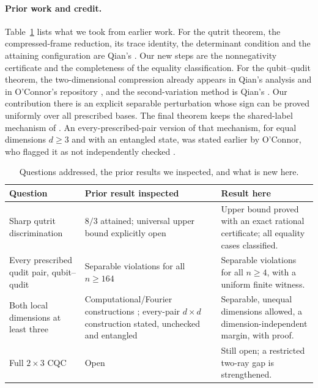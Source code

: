 \documentclass[11pt,a4paper]{article}
\numberwithin{equation}{section}
\theoremstyle{remark}\newtheorem{remark}[theorem]{Remark}
\begin{document}
\paragraph{Prior work and credit.}
Table~\ref{tab:prior} lists what we took from earlier work. For the qutrit theorem, the compressed-frame reduction, its trace identity, the determinant condition and the attaining configuration are Qian's \cite[Section~6]{qian}. Our new steps are the nonnegativity certificate and the completeness of the equality classification. For the qubit--qudit theorem, the two-dimensional compression already appears in Qian's analysis \cite[Proposition~6.9]{qian} and in O'Connor's repository \cite{oconnor}, and the second-variation method is Qian's \cite[Section~7]{qian}. Our contribution there is an explicit separable perturbation whose sign can be proved uniformly over all prescribed bases. The final theorem keeps the shared-label mechanism of \cite{wangcounter,qian}. An every-prescribed-pair version of that mechanism, for equal dimensions $d\ge3$ and with an entangled state, was stated earlier by O'Connor, who flagged it as not independently checked \cite{oconnor}.

\begin{table}[ht]
\centering\small
\caption{Questions addressed, the prior results we inspected, and what is new here.}
\label{tab:prior}
\begin{tabular}{>{\raggedright\arraybackslash}p{}>{\raggedright\arraybackslash}p{}>{\raggedright\arraybackslash}p{}}
\toprule
Question & Prior result inspected & Result here\\
\midrule
Sharp qutrit discrimination & $8/3$ attained; universal upper bound explicitly open \cite[Sections~6.5, 11(4)]{qian} & Upper bound proved with an exact rational certificate; all equality cases classified.\\
Every prescribed qudit pair, qubit--qudit & Separable violations for all $n\ge164$ \cite[Theorem~4.1]{qian} & Separable violations for all $n\ge4$, with a uniform finite witness.\\
Both local dimensions at least three & Computational/Fourier constructions \cite{wangcounter,qian}; every-pair $d\times d$ construction stated, unchecked and entangled \cite{oconnor} & Separable, unequal dimensions allowed, a dimension-independent margin, with proof.\\
Full $2\times3$ CQC & Open \cite[Section~11(1)]{qian} & Still open; a restricted two-ray gap is strengthened.\\
\bottomrule
\end{tabular}
\end{table}
\end{document}
